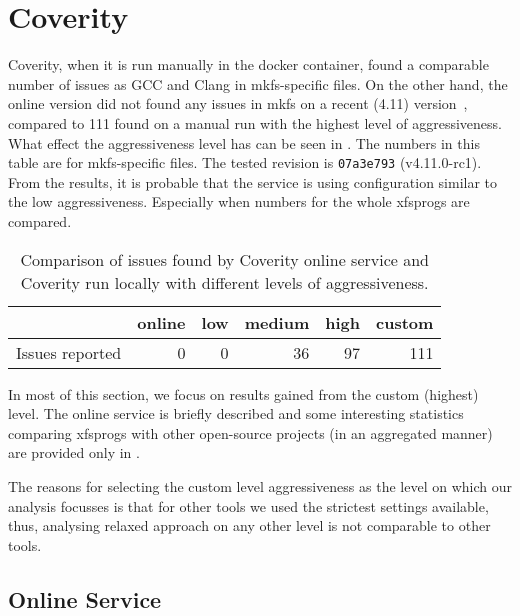 \section{Coverity}\label{chap:results:coverity}

Coverity, when it is run manually in the docker container, found a comparable
number of issues as GCC and Clang in mkfs-specific files. On the other hand,
the online version did not found any issues in mkfs on a recent (4.11)
version~\cite{CoverityXfsprogs}, compared to 111 found on a manual run with the
highest level of aggressiveness. What effect the aggressiveness level has can
be seen in . The numbers in this table are
for mkfs-specific files. The tested revision is {\tt 07a3e793} (v4.11.0-rc1).
From the results, it is probable that the service is using configuration similar
to the low aggressiveness.  Especially when numbers for the whole xfsprogs are
compared.


\begin{table}[h]
\begin{tabular}{|l||r|r|r|r|r|}
\hline
& online & low & medium & high & custom \\
\hline
Issues reported & 0 & 0 & 36 & 97 & 111 \\
\hline
\end{tabular}
\caption{Comparison of issues found by Coverity online service and Coverity run
locally with different levels of aggressiveness.}
\label{tab:results:coverity:levels}
\end{table}

In most of this section, we focus on results gained from the custom (highest)
level. The online service is briefly described and some interesting statistics
comparing xfsprogs with other open-source projects (in an aggregated manner)
are provided only in .

The reasons for selecting the custom level aggressiveness as the level on which
our analysis focusses is that for other tools we used the strictest settings
available, thus, analysing relaxed approach on any other level is not
comparable to other tools.

\subsection{Online Service}\label{chap:results:coverity:online}

